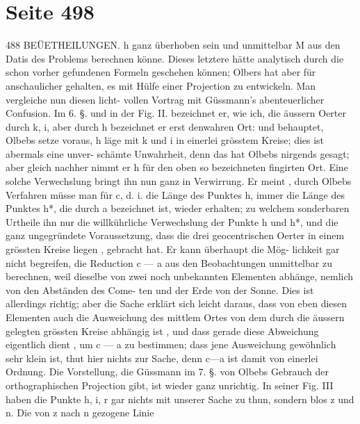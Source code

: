 \documentclass[10pt,a4paper]{article}
\begin{document}
\newpage
\section*{Seite 498}

488  BEÜETHEILUNGEN.
h  ganz  überhoben  sein  und  unmittelbar  M  aus  den  Datis  des  Problems  berechnen  könne.  Dieses  letztere
hätte  analytisch  durch  die  schon  vorher  gefundenen  Formeln  geschehen  können;  Olbers  hat  aber  für
anschaulicher  gehalten,  es  mit  Hülfe  einer  Projection  zu  entwickeln.  Man  vergleiche  nun  diesen  licht-
vollen Vortrag  mit  Güssmann's  abenteuerlicher  Confusion.  Im  6.  §.  und  in  der  Fig.  II.  bezeichnet  er,
wie  ich,  die  äussern  Oerter  durch  k,  i,  aber  durch  h  bezeichnet  er  erst  denwahren  Ort:  und  behauptet,
Olbebs  setze  voraus,  h  läge  mit  k  und  i  in  einerlei  grösstem  Kreise;  dies  ist  abermals  eine  unver-
schämte Unwahrheit,  denn  das  hat  Olbebs  nirgends  gesagt;  aber  gleich  nachher  nimmt  er  h  für  den
oben  so  bezeichneten  fingirten  Ort.  Eine  solche  Verwechslung  bringt  ihn  nun  ganz  in  Verwirrung.  Er
meint ,  durch  Olbebs  Verfahren  müsse  man  für  c\glqq{},  d.  i.  die  Länge  des  Punktes  h,  immer  die  Länge  des
Punktes  h*,  die  durch  a\glqq{}  bezeichnet  ist,  wieder  erhalten;  zu  welchem  sonderbaren  Urtheile  ihn  nur  die
willkührliche  Verwechslung  der  Punkte  h  und  h*,  und  die  ganz  ungegründete  Voraussetzung,  dass  die
drei  geocentrischen  Oerter  in  einem  grössten  Kreise  liegen ,  gebracht  hat.  Er  kann  überhaupt  die  Mög-
lichkeit gar  nicht  begreifen,  die  Reduction  c\glqq{} --- a\glqq{}  aus  den  Beobachtungen  unmittelbar  zu  berechnen,
weil  dieselbe  von  zwei  noch  unbekannten  Elementen  abhänge,  nemlich  von  den  Abständen  des  Come-
ten  und  der  Erde  von  der  Sonne.  Dies  ist  allerdings  richtig;  aber  die  Sache  erklärt  sich  leicht  daraus,
dass  von  eben  diesen  Elementen  auch  die  Ausweichung  des  mittlem  Ortes  von  dem  durch  die  äussern
gelegten  grössten  Kreise  abhängig  ist ,  und  dass  gerade  diese  Abweichung  eigentlich  dient ,  um  c\glqq{} ---  a\glqq{}
zu  bestimmen;  dass  jene  Ausweichung  gewöhnlich  sehr  klein  ist,  thut  hier  nichts  zur  Sache,  denn
c\glqq{}---a\glqq{}  ist  damit  von  einerlei  Ordnung.  Die  Vorstellung,  die  Güssmann  im  7.  §.  von  Olbebs  Gebrauch
der  orthographischen  Projection  gibt,  ist  wieder  ganz  unrichtig.  In  seiner  Fig.  III  haben  die  Punkte
h,  i,  r  gar  nichts  mit  unserer  Sache  zu  thun,  sondern  blos  z  und  n.  Die  von  z  nach  n  gezogene  Linie
\end{document}
